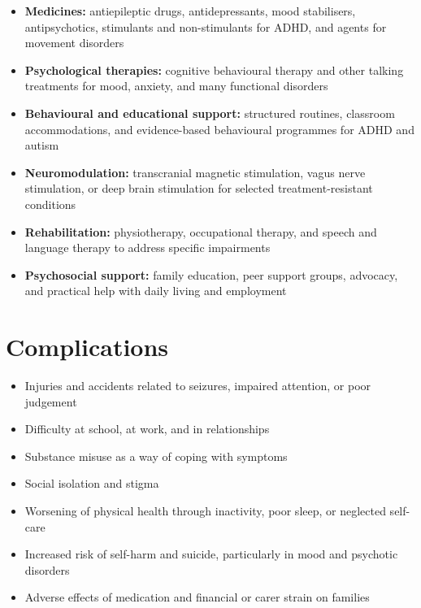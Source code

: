 \begin{itemize}
    \item \textbf{Medicines:} antiepileptic drugs, antidepressants, mood stabilisers, antipsychotics, stimulants and non-stimulants for ADHD, and agents for movement disorders
    \item \textbf{Psychological therapies:} cognitive behavioural therapy and other talking treatments for mood, anxiety, and many functional disorders
    \item \textbf{Behavioural and educational support:} structured routines, classroom accommodations, and evidence-based behavioural programmes for ADHD and autism
    \item \textbf{Neuromodulation:} transcranial magnetic stimulation, vagus nerve stimulation, or deep brain stimulation for selected treatment-resistant conditions
    \item \textbf{Rehabilitation:} physiotherapy, occupational therapy, and speech and language therapy to address specific impairments
    \item \textbf{Psychosocial support:} family education, peer support groups, advocacy, and practical help with daily living and employment
\end{itemize}

\section*{Complications}
\begin{itemize}
    \item Injuries and accidents related to seizures, impaired attention, or poor judgement
    \item Difficulty at school, at work, and in relationships
    \item Substance misuse as a way of coping with symptoms
    \item Social isolation and stigma
    \item Worsening of physical health through inactivity, poor sleep, or neglected self-care
    \item Increased risk of self-harm and suicide, particularly in mood and psychotic disorders
    \item Adverse effects of medication and financial or carer strain on families
\end{itemize}

